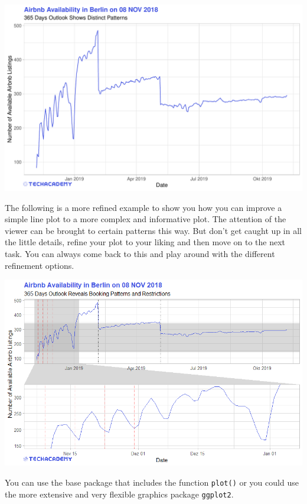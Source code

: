 \documentclass[
  11pt,
]{article}
\newenvironment{tips}[1]
  {
  \begin{itemize}
  \footnotesize
  \renewcommand{\labelitemi}{
    \raisebox{-.7\height}[0pt][0pt]{
      {\setkeys{Gin}{width=3em,keepaspectratio}
        \texttt{[image: images/\#1.png]}}
    }
  }
  \setlength{\fboxsep}{1em}
  \begin{rbox}
  \item
  }
  {
  \end{rbox}
  \end{itemize}
  }
\begin{document}
\begin{center}\includegraphics[width=1\linewidth]{plot/1_3_AvailabilityOutlook} \end{center}

The following is a more refined example to show you how you can improve a simple line plot to a more complex and informative plot. The attention of the viewer can be brought to certain patterns this way. But don't get caught up in all the little details, refine your plot to your liking and then move on to the next task. You can always come back to this and play around with the different refinement options.

\includegraphics[width=1\linewidth]{plot/1_3_AvailabilityOutlook_advanced}

\begin{tips}r

You can use the base package that includes the function \texttt{plot()} or you could use the more extensive and very flexible graphics package \texttt{ggplot2}.

\end{tips}
\end{document}
